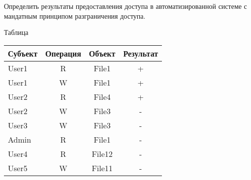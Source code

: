 \begin{problem}
  Определить результаты предоставления доступа в автоматизированной системе с
  мандатным принципом разграничения доступа.
\end{problem}

\begin{solution}
  Таблица

  \begin{table}[H]
  \centering
  \begin{tabular}{|l|c|c|c|}
  \hline
  Субъект & Операция & Объект & Результат \\ \hline
  User1 & R & File1 & + \\ \hline
  User1 & W & File1 & + \\ \hline
  User2 & R & File4 & + \\ \hline
  User2 & W & File3 & - \\ \hline
  User3 & W & File3 & - \\ \hline
  Admin & R & File1 & - \\ \hline
  User4 & R & File12 & - \\ \hline
  User5 & W & File11 & - \\ \hline
  \end{tabular}
  \end{table}

\end{solution}
